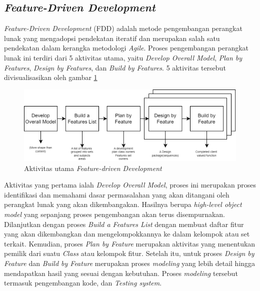 \subsection{\textit{Feature-Driven Development}}
\textit{Feature-Driven Development} (FDD) adalah metode pengembangan perangkat lunak yang mengadopsi pendekatan iteratif dan merupakan salah satu pendekatan dalam kerangka metodologi \textit{Agile}.
Proses pengembangan perangkat lunak ini terdiri dari 5 aktivitas utama, yaitu \textit{Develop Overall Model}, \textit{Plan by Features}, \textit{Design by Features}, dan \textit{Build by Features}.
5 aktivitas tersebut divisualisasikan oleh gambar \ref*{Fig:FDD-langkah}
\begin{figure}[H]
	\centering
	\includegraphics[width=\textwidth]{contents/chapter-2/images/FDD.png}
	\caption{Aktivitas utama \textit{Feature-driven Development}\cite{palmer2001practical}}
	\label{Fig:FDD-langkah}
\end{figure}
Aktivitas yang pertama ialah \textit{Develop Overall Model}, proses ini merupakan proses identifikasi dan memahami dasar permasalahan yang akan ditangani oleh perangkat lunak yang akan dikembangakan.
Hasilnya berupa \textit{high-level object model} yang sepanjang proses pengembangan akan terus disempurnakan. Dilanjutkan dengan proses \textit{Build a Features List} dengan membuat daftar fitur yang akan dikembangkan dan mengelompokkannya ke dalam kelompok atau set terkait.
Kemudian, proses \textit{Plan by Feature} merupakan aktivitas yang menentukan pemilik dari suatu \textit{Class} atau kelompok fitur.
Setelah itu, untuk proses \textit{Design by Feature} dan \textit{Build by Feature} merupakan proses \textit{modeling} yang lebih detail hingga mendapatkan hasil yang sesuai dengan kebutuhan.
Proses \textit{modeling} tersebut termasuk pengembangan kode, dan \textit{Testing system}.
